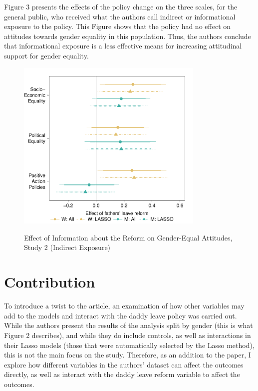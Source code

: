 \documentclass[12pt,letterpaper]{article}
\begin{document}
\newpage
\noindent Figure 3 presents the effects of the policy change on the three scales, for the general public, who received what the authors call indirect or informational exposure to the policy. This Figure shows that the policy had no effect on attitudes towards gender equality in this population. Thus, the authors conclude that informational exposure is a less effective means for increasing attitudinal support for gender equality. 

\begin{figure}[H]
	\centering
	\caption{Effect of Information about the Reform on Gender-Equal Attitudes, Study 2 (Indirect Exposure)}
	\includegraphics[width=0.8\textwidth]{Fig2}
	\label{fig:my_label}
\end{figure}

\newpage
\section*{Contribution} 
\vspace{.25cm}
\noindent 

\noindent To introduce a twist to the article, an examination of how other variables may add to the models and interact with the daddy leave policy was carried out. While the authors present the results of the analysis split by gender (this is what Figure 2 describes), and while they do include controls, as well as interactions in their Lasso models (those that were automatically selected by the Lasso method), this is not the main focus on the study. Therefore, as an addition to the paper, I explore how different variables in the authors' dataset can affect the outcomes directly, as well as interact with the daddy leave reform variable to affect the outcomes. 
\end{document}
